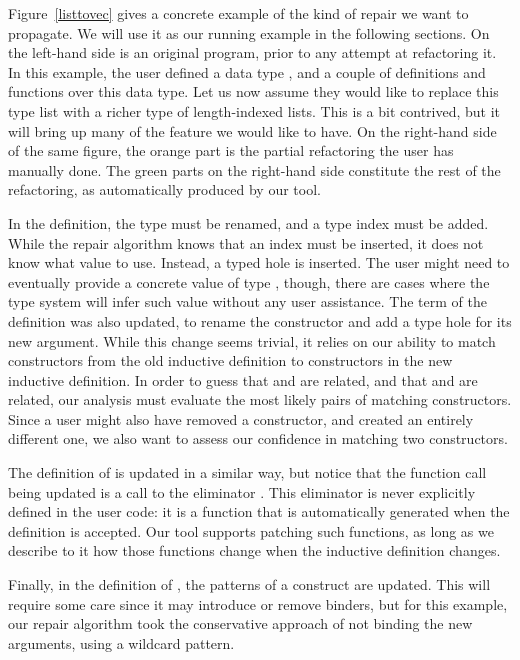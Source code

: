 Figure~\ref{listtovec} gives a concrete example of the kind of repair we want to
propagate.  We will use it as our running example in the following sections.  On
the left-hand side is an original program, prior to any attempt at refactoring
it.  In this example, the user defined a data type , and a
couple of definitions and functions over this data type.  Let us now assume they
would like to replace this type list with a richer type of length-indexed lists.
This is a bit contrived, but it will bring up many of the feature we would like
to have.  On the right-hand side of the same figure, the orange part is the
partial refactoring the user has manually done.  The green parts on the
right-hand side constitute the rest of the refactoring, as automatically
produced by our tool.

In the  definition, the type must be renamed, and a type index
must be added.  While the repair algorithm knows that an index must be inserted,
it does not know what value to use.  Instead, a typed hole 
is inserted.  The user might need to eventually provide a concrete value of type
, though, there are cases where the type system will infer such
value without any user assistance.  The term of the definition was also updated,
to rename the constructor and add a type hole for its new argument.  While this
change seems trivial, it relies on our ability to match constructors from the
old inductive definition to constructors in the new inductive definition.  In
order to guess that  and  are related, and that
 and  are related, our analysis must evaluate
the most likely pairs of matching constructors.  Since a user might also have
removed a constructor, and created an entirely different one, we also want to
assess our confidence in matching two constructors.

The definition of  is updated in a similar way, but notice
that the function call being updated is a call to the eliminator
.  This eliminator is never explicitly defined in the user
code: it is a function that is automatically generated when the 
definition is accepted.  Our tool supports patching such functions, as long as
we describe to it how those functions change when the inductive definition
changes.

Finally, in the definition of , the patterns of a
 construct are updated.  This will require some care since it
may introduce or remove binders, but for this example, our repair algorithm took
the conservative approach of not binding the new arguments, using a wildcard
\coqinline{_} pattern.
